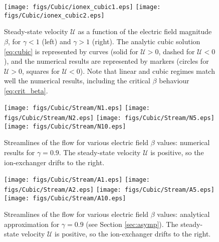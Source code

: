 \documentclass[preprint,10pt]{elsarticle}
\newcommand\cU{\mathscr{U}}
\begin{document}
\begin{figure}
    \begin{center}
    \texttt{[image: figs/Cubic/ionex\_cubic1.eps]}
    \texttt{[image: figs/Cubic/ionex\_cubic2.eps]}
        \caption[Ion exchanger steady-state velocity]{
        Steady-state velocity $\cU$ as a function of the 
        electric field magnitude $\beta$, for $\gamma < 1$ (left) and $\gamma > 1$ (right). 
        The analytic cubic solution \eqref{eq:cubic} is represented by curves
        (solid for $\cU > 0$, dashed for $\cU < 0$), 
        and the numerical results are represented by markers 
        (circles for $\cU > 0$, squares for $\cU < 0$). Note that linear and
        cubic regimes match well the numerical results, including the critical $\beta$ 
        behaviour \eqref{eq:crit_beta}. 
        }
	    \label{fig:IonExCubic}
    \end{center}
\end{figure}

\begin{figure}
    \begin{center}
	\texttt{[image: figs/Cubic/Stream/N1.eps]}
	\texttt{[image: figs/Cubic/Stream/N2.eps]}
	\texttt{[image: figs/Cubic/Stream/N5.eps]}
	\texttt{[image: figs/Cubic/Stream/N10.eps]}
        \caption[Ion exchanger streamlines -- numerical results]{
        Streamlines of the flow for various electric field $\beta$ values: 
        numerical results for $\gamma = 0.9$.  
        The steady-state velocity $\cU$ is positive, so the
        ion-exchanger drifts to the right. }
    \label{fig:Vortex1}
    \end{center}
\end{figure}

\begin{figure}
    \begin{center}
	\texttt{[image: figs/Cubic/Stream/A1.eps]}
	\texttt{[image: figs/Cubic/Stream/A2.eps]}
	\texttt{[image: figs/Cubic/Stream/A5.eps]}
	\texttt{[image: figs/Cubic/Stream/A10.eps]}
        \caption[Ion exchanger streamlines -- analytical results]{
        Streamlines of the flow for various electric field $\beta$ values: 
        analytical approximation for $\gamma = 0.9$ (see Section \ref{sec:asymp}).
        The steady-state velocity $\cU$ is positive, so the
        ion-exchanger drifts to the right.}
    \label{fig:Vortex2}
    \end{center}
\end{figure}
\end{document}
